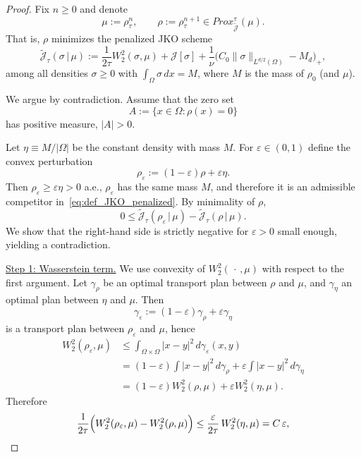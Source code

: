 \documentclass[a4paper,twosided, 11pt]{article}
\theoremstyle{plain}
\theoremstyle{remark}
\numberwithin{equation}{section}
\begin{document}
{\begin{proof}
Fix $n\ge 0$ and denote
\[
\mu:=\rho_\tau^n,
\qquad
\rho:=\rho_\tau^{n+1}\in Prox_{\widetilde{\mathcal J}}^\tau(\mu).
\]
That is, $\rho$ minimizes the penalized JKO scheme
\begin{equation}\label{eq:def_JKO_penalized}
\widetilde{\mathcal J}_\tau(\sigma\,|\,\mu)
:=\frac{1}{2\tau}W_2^2(\sigma,\mu)
+\mathcal J[\sigma]
+\frac1\nu\bigl(C_0\|\sigma\|_{L^{d/2}(\Omega)}-M_d\bigr)_+,
\end{equation}
among all densities $\sigma\ge 0$ with $\int_\Omega \sigma\,dx=M$, where $M$ is the mass of $\rho_0$ (and $\mu$).

We argue by contradiction. Assume that the zero set
\[
A:=\{x\in\Omega:\rho(x)=0\}
\]
has positive measure, $|A|>0$.

Let $\eta\equiv M/|\Omega|$ be the constant density with mass $M$.
For $\varepsilon\in(0,1)$ define the convex perturbation
\[
\rho_\varepsilon:=(1-\varepsilon)\rho+\varepsilon\eta.
\]
Then $\rho_\varepsilon\ge \varepsilon\eta>0$ a.e., $\rho_\varepsilon$ has the same mass $M$, and therefore it is an admissible
competitor in~\eqref{eq:def_JKO_penalized}. By minimality of $\rho$,
\begin{equation}\label{eq:minimality_start}
0\le \widetilde{\mathcal J}_\tau(\rho_\varepsilon\,|\,\mu)-\widetilde{\mathcal J}_\tau(\rho\,|\,\mu).
\end{equation}
We show that the right-hand side is strictly negative for $\varepsilon>0$ small enough, yielding a contradiction.

\medskip
\underline{Step 1: Wasserstein term.}
We use convexity of $W_2^2(\,\cdot\,,\mu)$ with respect to the first argument.
Let $\gamma_\rho$ be an optimal transport plan between $\rho$ and $\mu$, and $\gamma_\eta$ an optimal plan between $\eta$ and $\mu$.
Then
\[
\gamma_\varepsilon:=(1-\varepsilon)\gamma_\rho+\varepsilon\gamma_\eta
\]
is a transport plan between $\rho_\varepsilon$ and $\mu$, hence
\begin{align*}
W_2^2(\rho_\varepsilon,\mu)
&\le \int_{\Omega\times\Omega}|x-y|^2\,d\gamma_\varepsilon(x,y)\\
&=(1-\varepsilon)\int |x-y|^2\,d\gamma_\rho+\varepsilon\int |x-y|^2\,d\gamma_\eta\\
&=(1-\varepsilon)W_2^2(\rho,\mu)+\varepsilon W_2^2(\eta,\mu).
\end{align*}
Therefore
\begin{equation}\label{eq:W2_Oeps}
\frac{1}{2\tau}\Bigl(W_2^2(\rho_\varepsilon,\mu)-W_2^2(\rho,\mu)\Bigr)
\le \frac{\varepsilon}{2\tau}\,W_2^2(\eta,\mu)
=C\,\varepsilon,
\end{equation}



\end{proof}}
\end{document}
